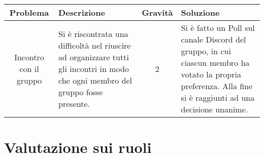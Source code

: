 \quad
\def\tabularxcolumn#1{m{#1}}
{
	
	\begin{center}
		\renewcommand{\arraystretch}{1.4}
		\begin{tabularx}{\textwidth}{|c|X|c|X|}
			\hline
			\rowcolor{airforceblue}
			\textbf{Problema} & \textbf{Descrizione} & \textbf{Gravità} & \textbf{Soluzione}\\
			\hline
			Incontro con il gruppo & Si è riscontrata una difficoltà nel riuscire ad organizzare tutti gli incontri in modo che ogni membro del gruppo fosse presente. & 2 & Si è fatto un Poll sul canale Discord del gruppo, in cui ciascun membro ha votato la propria preferenza. Alla fine si è raggiunti ad una decisione unanime. \\
			\hline
		\end{tabularx}
	\end{center}
\clearpage

\section{Valutazione sui ruoli}  \label{ValutazionePerIlMiglioramentoValutazioneSuiRuoli}

\quad
\def\tabularxcolumn#1{m{#1}}
{
	
}}
